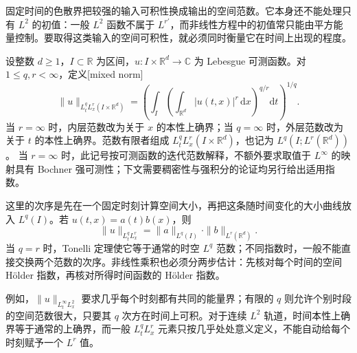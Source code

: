 \ProseParagraphBreak

固定时间的色散界把较强的输入可积性换成输出的空间范数。它本身还不能处理只有 \(L^2\) 的初值：一般 \(L^2\) 函数不属于 \(L^{r'}\)，而非线性方程中的初值常只能由平方能量控制。要取得这类输入的空间可积性，就必须同时衡量它在时间上出现的程度。

\begin{definition}\label{b2:def:E-mixed-norm}
设整数 \(d\geq1\)，\(I\subset\mathbb R\) 为区间，\(u:I\times\mathbb R^d\to\mathbb C\) 为 Lebesgue 可测函数。对 \(1\leq q,r<\infty\)，定义[mixed norm]
\[
 \|u\|_{L^q_tL^r_x(I\times\mathbb R^d)}
 =\left(\int_I
     \left(\int_{\mathbb R^d}|u(t,x)|^r\,\mathrm dx\right)^{q/r}
                   \mathrm dt\right)^{1/q}.
\]
当 \(r=\infty\) 时，内层范数改为关于 \(x\) 的本性上确界；当 \(q=\infty\) 时，外层范数改为关于 \(t\) 的本性上确界。范数有限者组成 \(L^q_tL^r_x(I\times\mathbb R^d)\)，也记为 \(L^q(I;L^r(\mathbb R^d))\)。
当 \(r=\infty\) 时，此记号按可测函数的迭代范数解释，不额外要求取值于 \(L^\infty\) 的映射具有 Bochner 强可测性；下文需要稠密性与强积分的论证均另行给出适用指数。
\end{definition}
这里的次序是先在一个固定时刻计算空间大小，再把这条随时间变化的大小曲线放入 \(L^q(I)\)。若 \(u(t,x)=a(t)b(x)\)，则
\[
 \|u\|_{L^q_tL^r_x}=\|a\|_{L^q(I)}\cdot\|b\|_{L^r(\mathbb R^d)}.
\]
当 \(q=r\) 时，Tonelli 定理使它等于通常的时空 \(L^q\) 范数；不同指数时，一般不能直接交换两个范数的次序。非线性乘积也必须分两步估计：先核对每个时间的空间 Hölder 指数，再核对所得时间函数的 Hölder 指数。

\ProseParagraphBreak

例如，\(\|u\|_{L^\infty_tL^2_x}\) 要求几乎每个时刻都有共同的能量界；有限的 \(q\) 则允许个别时段的空间范数很大，只要其 \(q\) 次方在时间上可积。对于连续 \(L^2\) 轨道，时间本性上确界等于通常的上确界，而一般 \(L^q_tL^r_x\) 元素只按几乎处处意义定义，不能自动给每个时刻赋予一个 \(L^r\) 值。

